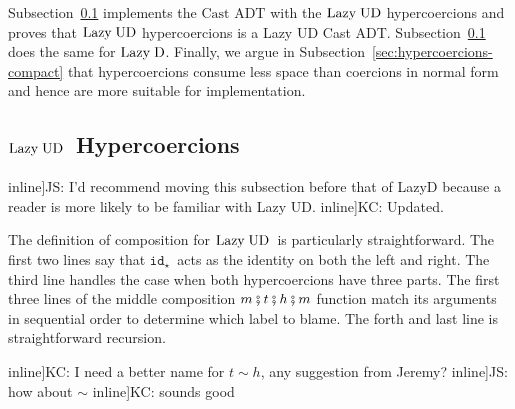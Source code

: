 \documentclass[runningheads]{llncs}
\newcommand{\todo}[1]{}
\newcommand{\figref}[1]{Fig.~\ref{#1}}
\newcommand{\LUD}{\ensuremath{\text{Lazy\;UD}}}
\newcommand{\LD}{\ensuremath{\text{Lazy\;D}}}
\newcommand{\CastADT}{\ensuremath{\text{Cast ADT}}}
\newcommand{\Tdyn}[0]{\ensuremath{\star}}
\newcommand{\ccast}[3]{#1 \xRightarrow[]{\enskip #2 \enskip} #3}
\newcommand{\cnfid}[1]{\ensuremath{\mathtt{id}_{#1}}}
\newcommand{\hcci}[0]{\cnfid{\Tdyn}}
\newcommand{\compose}[2]{\ensuremath{#1 \fatsemi #2}}
\newcommand{\translate}[1]{\ensuremath{\lceil#1\rceil}}
\newcommand{\id}[1]{\ensuremath{\mathrm{id}(#1)}}
\newcommand{\compatibletailhead}[2]{\ensuremath{#1\sim#2}}
\begin{document}
Subsection~\ref{sec:LazyUD-Hypercoercions} implements the \CastADT{}
with the \LUD{} hypercoercions and proves that \LUD{} hypercoercions is
a Lazy UD Cast ADT.  Subsection~\ref{sec:LazyUD-Hypercoercions} does
the same for \LD{}.  Finally, we argue in
Subsection~\ref{sec:hypercoercions-compact} that hypercoercions
consume less space than coercions in normal form and hence are more
suitable for implementation.

\subsection{\LUD\ Hypercoercions} \label{sec:LazyUD-Hypercoercions}

\todo[inline]{JS: I'd recommend moving this subsection before that of
  LazyD because a reader is more likely to be familiar with Lazy UD.}
\todo[inline]{KC: Updated.}

The definition of composition for \LUD\ is particularly straightforward.
The first two lines say that \hcci\ acts as the identity on both the left
and right.
The third line handles the case when both hypercoercions have three parts. 
%
The first three lines of the middle composition $m \fatsemi t \fatsemi h 
\fatsemi m$ function match its arguments in sequential order to determine which 
label to blame. The forth and last line is straightforward recursion.

\todo[inline]{KC: I need a better name for \compatibletailhead{t}{h},
  any suggestion from Jeremy?}
\todo[inline]{JS: how about $\sim$}
\todo[inline]{KC: sounds good}

\end{document}
